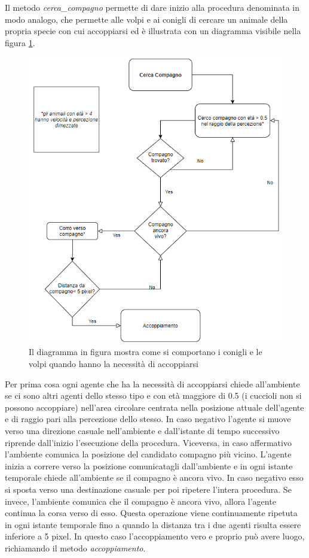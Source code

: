 \documentclass[11pt]{article}
\begin{document}
Il metodo \emph{cerca\_compagno} permette di dare inizio alla procedura denominata in modo analogo, che permette alle volpi e ai conigli di cercare un animale della propria specie con cui accoppiarsi ed è illustrata con un diagramma visibile nella figura \ref{fig:diagrammaAccoppiamento}.
\begin{figure}
     \centering
     \includegraphics[scale = 0.7]{Cerca_Compagno.PNG}
     \caption{Il diagramma in figura mostra come si comportano i conigli e le volpi quando hanno la necessità di accoppiarsi}
     \label{fig:diagrammaAccoppiamento}
\end{figure}
Per prima cosa ogni agente che ha la necessità di accoppiarsi chiede all'ambiente se ci sono altri agenti dello stesso tipo e con età maggiore di 0.5 (i cuccioli non si possono accoppiare) nell'area circolare centrata nella posizione attuale dell'agente e di raggio pari alla percezione dello stesso.
In caso negativo l'agente si muove verso una direzione casuale nell'ambiente e dall'istante di tempo successivo riprende dall'inizio l'esecuzione della procedura. Viceversa, in caso affermativo l'ambiente comunica la posizione del candidato compagno più vicino. L'agente inizia a correre verso la posizione comunicatagli dall'ambiente e in ogni istante temporale chiede all'ambiente se il compagno è ancora vivo. In caso negativo esso si sposta verso una destinazione casuale per poi ripetere l'intera procedura. Se invece, l'ambiente comunica che il compagno è ancora vivo, allora l'agente continua la corsa verso di esso. Questa operazione viene continuamente ripetuta in ogni istante temporale fino a quando la distanza tra i due agenti risulta essere inferiore a 5 pixel. In questo caso l'accoppiamento vero e proprio può avere luogo, richiamando il metodo \emph{accoppiamento}. 
\end{document}
